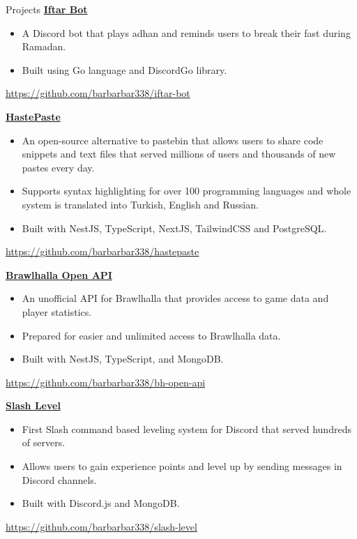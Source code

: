 \begin{rubric}{Projects}
    \entry*[2021]%
        \href{https://github.com/barbarbar338/iftar-bot}{\textbf{Iftar Bot}}
        \begin{itemize}
            \item A Discord bot that plays adhan and reminds users to break their fast during Ramadan.
            \item Built using Go language and DiscordGo library.
        \end{itemize}
        \par \url{https://github.com/barbarbar338/iftar-bot}

    \entry*[2020]%
        \href{https://github.com/barbarbar338/hastepaste}{\textbf{HastePaste}}
        \begin{itemize}
            \item An open-source alternative to pastebin that allows users to share code snippets and text files that served millions of users and thousands of new pastes every day.
            \item Supports syntax highlighting for over 100 programming languages and whole system is translated into Turkish, English and Russian.
            \item Built with NestJS, TypeScript, NextJS, TailwindCSS and PostgreSQL.
        \end{itemize}
        \par \url{https://github.com/barbarbar338/hastepaste}

    \entry*[2020]%
        \href{https://github.com/barbarbar338/bh-open-api}{\textbf{Brawlhalla Open API}}
        \begin{itemize}
            \item An unofficial API for Brawlhalla that provides access to game data and player statistics.
            \item Prepared for easier and unlimited access to Brawlhalla data.
            \item Built with NestJS, TypeScript, and MongoDB.
        \end{itemize}
        \par \url{https://github.com/barbarbar338/bh-open-api}

    \entry*[2020]%
        \href{https://github.com/barbarbar338/slash-level}{\textbf{Slash Level}}
        \begin{itemize}
            \item First Slash command based leveling system for Discord that served hundreds of servers.
            \item Allows users to gain experience points and level up by sending messages in Discord channels.
            \item Built with Discord.js and MongoDB.
        \end{itemize}
        \par \url{https://github.com/barbarbar338/slash-level}


\end{rubric}
